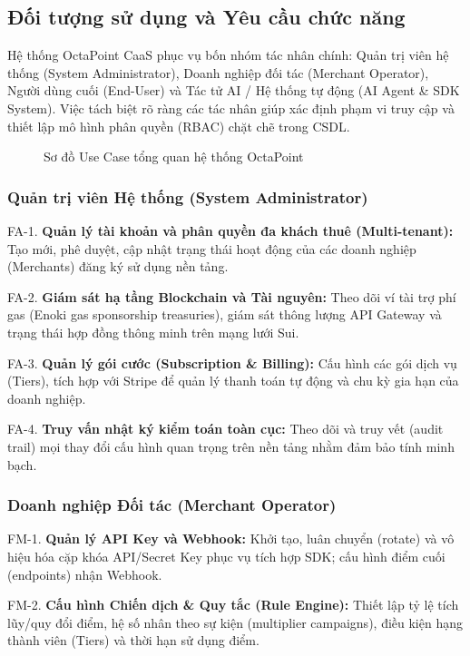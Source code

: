 \subsection{Đối tượng sử dụng và Yêu cầu chức năng}
Hệ thống OctaPoint CaaS phục vụ bốn nhóm tác nhân chính: Quản trị viên hệ thống (System Administrator), Doanh nghiệp đối tác (Merchant Operator), Người dùng cuối (End-User) và Tác tử AI / Hệ thống tự động (AI Agent \& SDK System). Việc tách biệt rõ ràng các tác nhân giúp xác định phạm vi truy cập và thiết lập mô hình phân quyền (RBAC) chặt chẽ trong CSDL.

\begin{figure}[H]
    \centering
    \caption{Sơ đồ Use Case tổng quan hệ thống OctaPoint}
    \label{fig:usecase_tong_quan}
\end{figure}

\subsubsection{Quản trị viên Hệ thống (System Administrator)}
FA-1. \textbf{Quản lý tài khoản và phân quyền đa khách thuê (Multi-tenant):} Tạo mới, phê duyệt, cập nhật trạng thái hoạt động của các doanh nghiệp (Merchants) đăng ký sử dụng nền tảng.

FA-2. \textbf{Giám sát hạ tầng Blockchain và Tài nguyên:} Theo dõi ví tài trợ phí gas (Enoki gas sponsorship treasuries), giám sát thông lượng API Gateway và trạng thái hợp đồng thông minh trên mạng lưới Sui.

FA-3. \textbf{Quản lý gói cước (Subscription \& Billing):} Cấu hình các gói dịch vụ (Tiers), tích hợp với Stripe để quản lý thanh toán tự động và chu kỳ gia hạn của doanh nghiệp.

FA-4. \textbf{Truy vấn nhật ký kiểm toán toàn cục:} Theo dõi và truy vết (audit trail) mọi thay đổi cấu hình quan trọng trên nền tảng nhằm đảm bảo tính minh bạch.

\subsubsection{Doanh nghiệp Đối tác (Merchant Operator)}
FM-1. \textbf{Quản lý API Key và Webhook:} Khởi tạo, luân chuyển (rotate) và vô hiệu hóa cặp khóa API/Secret Key phục vụ tích hợp SDK; cấu hình điểm cuối (endpoints) nhận Webhook.

FM-2. \textbf{Cấu hình Chiến dịch \& Quy tắc (Rule Engine):} Thiết lập tỷ lệ tích lũy/quy đổi điểm, hệ số nhân theo sự kiện (multiplier campaigns), điều kiện hạng thành viên (Tiers) và thời hạn sử dụng điểm.

